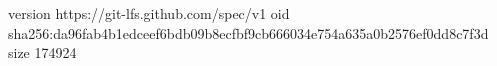 version https://git-lfs.github.com/spec/v1
oid sha256:da96fab4b1edceef6bdb09b8ecfbf9cb666034e754a635a0b2576ef0dd8c7f3d
size 174924
